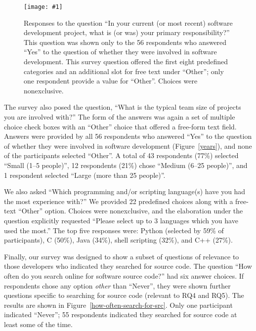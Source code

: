 \documentclass[review]{elsarticle}
\newcommand{\totalDevelopers}{56\xspace}
\newcommand{\totalSearchers}{55\xspace}
\newcommand{\includefile}[1]{\texttt{[image: \#1]}}
\begin{document}
\begin{figure}[bht]
  \centering
  \includefile{files/plots/responsibilities.pdf}
  \vspace*{-5ex}
  \caption{Responses to the question  ``In your current (or most recent) software development project, what is (or was) your primary responsibility?''  This question was shown only to the 56 respondents who answered ``Yes'' to the question of whether they were involved in software development.  This survey question offered the first eight predefined categories and an additional slot for free text under ``Other''; only one respondent provide a value for ``Other''.  Choices were nonexclusive.}
  \label{responsibilities}
\end{figure}

The survey also posed the question, ``What is the typical team size of projects you are involved with?''  The form of the answers was again a set of multiple choice check boxes with an ``Other'' choice that offered a free-form text field.  Answers were provided by all \totalDevelopers respondents who answered ``Yes'' to the question of whether they were involved in software development (Figure~\ref{years}), and none of the participants selected ``Other''.  A total of 43 respondents (77\%) selected ``Small (1--5 people)'', 12 respondents (21\%) chose ``Medium (6--25 people)'', and 1 respondent selected ``Large (more than 25 people)''.

We also asked ``Which programming and/or scripting language(s) have you had the most experience with?''  We provided 22 predefined choices along with a free-text ``Other'' option.  Choices were nonexclusive, and the elaboration under the question explicitly requested ``Please select up to 3 languages which you have used the most.''   The top five responses were: Python (selected by 59\% of participants), C (50\%), Java (34\%), shell scripting (32\%), and C++ (27\%).

Finally, our survey was designed to show a subset of questions of relevance to those developers who indicated they searched for source code.  The question ``How often do you search online for software source code?'' had six answer choices.  If respondents chose any option \emph{other} than ``Never'', they were shown further questions specific to searching for source code (relevant to RQ4 and RQ5). The results are shown in Figure~\ref{how-often-search-for-src}.  Only one participant indicated ``Never''; \totalSearchers respondents indicated they searched for source code at least some of the time.
\end{document}
